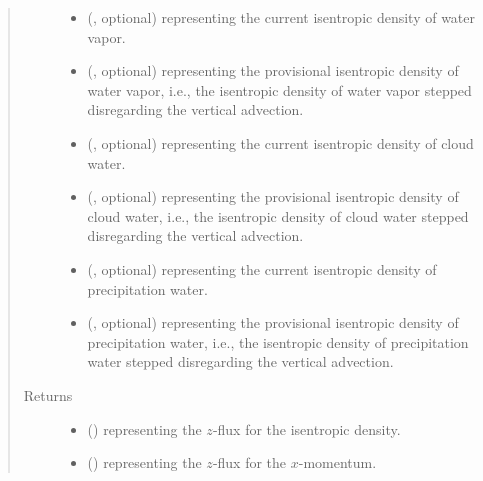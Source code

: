 \documentclass[letterpaper,10pt,english]{sphinxmanual}
\begin{document}
\begin{fulllineitems}
\begin{fulllineitems}
\begin{quote}
\begin{description}
\begin{itemize}
\item {} 
 (, optional) \textendash{}  representing the current isentropic density of water vapor.

\item {} 
 (, optional) \textendash{}  representing the provisional isentropic density of water vapor,
i.e., the isentropic density of water vapor stepped disregarding the vertical advection.

\item {} 
 (, optional) \textendash{}  representing the current isentropic density of cloud water.

\item {} 
 (, optional) \textendash{}  representing the provisional isentropic density of cloud water,
i.e., the isentropic density of cloud water stepped disregarding the vertical advection.

\item {} 
 (, optional) \textendash{}  representing the current isentropic density of precipitation water.

\item {} 
 (, optional) \textendash{}  representing the provisional isentropic density of precipitation water,
i.e., the isentropic density of precipitation water stepped disregarding the vertical advection.

\end{itemize}

\item[{Returns}] \leavevmode
\begin{itemize}
\item {} 
 () \textendash{}  representing the \(z\)-flux for the isentropic density.

\item {} 
 () \textendash{}  representing the \(z\)-flux for the \(x\)-momentum.


\end{itemize}
\end{description}
\end{quote}
\end{fulllineitems}
\end{fulllineitems}
\end{document}
